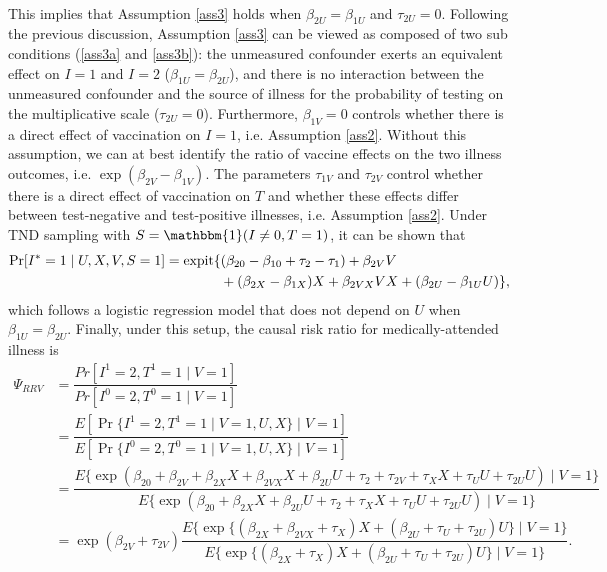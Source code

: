 \begin{appendix}
\begin{align*}
\end{align*}
This implies that Assumption \ref{ass3} holds when $\beta_{2U}=\beta_{1U}$ and $\tau_{2U}=0$. Following the previous discussion, Assumption \ref{ass3} can be viewed as composed of two sub conditions (\ref{ass3a} and \ref{ass3b}): the unmeasured confounder exerts an equivalent effect on $I=1$ and $I=2$ ($\beta_{1U}=\beta_{2U}$), and there is no interaction between the unmeasured confounder and the source of illness for the probability of testing on the multiplicative scale ($\tau_{2U}=0$). Furthermore, $\beta_{1V}=0$ controls whether there is a direct effect of vaccination on $I = 1$, i.e. Assumption \ref{ass2}. Without this assumption, we can at best identify the ratio of vaccine effects on the two illness outcomes, i.e. $\exp(\beta_{2V}-\beta_{1V})$. The parameters $\tau_{1V}$ and $\tau_{2V}$ control whether there is a direct effect of vaccination on $T$ and whether these effects differ between test-negative and test-positive illnesses, i.e. Assumption \ref{ass2}. Under TND sampling with $S=\mathbbm{1}(I \neq 0, T = 1)$, it can be shown that
\begin{align*}
    \Pr[I^*=1 \mid U, X, V, S=1] &= \expit\{(\beta_{20}-\beta_{10}+\tau_2 - \tau_1) + \beta_{2V}V\\ &\qquad\qquad+(\beta_{2X}-\beta_{1X})X+\beta_{2VX}VX + (\beta_{2U} - \beta_{1U}U)\},
\end{align*}
which follows a logistic regression model that does not depend on $U$ when $\beta_{1U}=\beta_{2U}$. Finally, under this setup, the causal risk ratio for medically-attended illness is 
\begin{align*}
    \Psi_{RRV} &= \dfrac{Pr[I^1=2, T^1=1\mid V=1]}{Pr[I^0=2, T^0=1\mid V=1]}\\
    &= \dfrac{E[\Pr\{I^1=2, T^1=1\mid V=1, U, X\}\mid V=1]}{E[\Pr\{I^0=2, T^0=1\mid V=1, U, X\}\mid V=1]}\\
    &= \dfrac{E\{\exp(\beta_{20} + \beta_{2V} + \beta_{2X}X + \beta_{2VX}X + \beta_{2U}U + \tau_2 + \tau_{2V} + \tau_X X + \tau_U U + \tau_{2U} U)\mid V=1\}}{E\{\exp(\beta_{20} +  \beta_{2X}X  + \beta_{2U}U + \tau_2 + \tau_X X + \tau_U U + \tau_{2U} U)\mid V=1\}}\\
    &= \exp(\beta_{2V} + \tau_{2V}) \dfrac{E\{\exp\{(\beta_{2X} + \beta_{2VX} + \tau_X) X + (\beta_{2U} + \tau_U + \tau_{2U}) U\}\mid V=1\}}{E\{\exp\{ (\beta_{2X} + \tau_X)X  + (\beta_{2U} + \tau_U + \tau_{2U}) U\}\mid V=1\}}.
\end{align*}


\begin{figure}[t]
    \centering
    \begin{tikzpicture}
        

\end{tikzpicture}
\end{figure}
\end{appendix}
